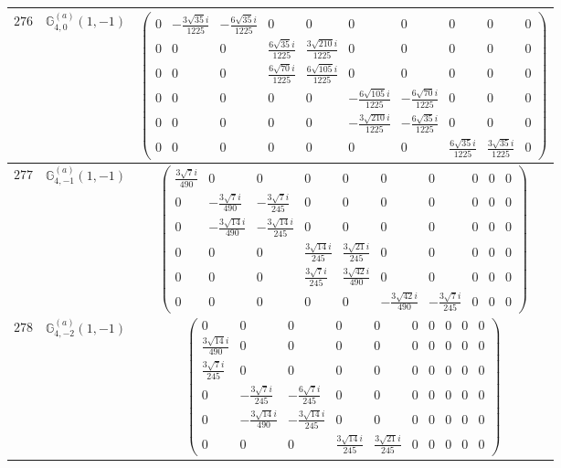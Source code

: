 \documentclass[fleqn,8pt,landscape]{jsarticle}
\begin{document}
\begin{center}
\begin{longtable}{ccc}
$ 276 $ & $ \mathbb{G}_{4,0}^{(a)}(1,-1) $ & $ \begin{pmatrix} 0 & - \frac{3 \sqrt{35} i}{1225} & - \frac{6 \sqrt{35} i}{1225} & 0 & 0 & 0 & 0 & 0 & 0 & 0 \\ 0 & 0 & 0 & \frac{6 \sqrt{35} i}{1225} & \frac{3 \sqrt{210} i}{1225} & 0 & 0 & 0 & 0 & 0 \\ 0 & 0 & 0 & \frac{6 \sqrt{70} i}{1225} & \frac{6 \sqrt{105} i}{1225} & 0 & 0 & 0 & 0 & 0 \\ 0 & 0 & 0 & 0 & 0 & - \frac{6 \sqrt{105} i}{1225} & - \frac{6 \sqrt{70} i}{1225} & 0 & 0 & 0 \\ 0 & 0 & 0 & 0 & 0 & - \frac{3 \sqrt{210} i}{1225} & - \frac{6 \sqrt{35} i}{1225} & 0 & 0 & 0 \\ 0 & 0 & 0 & 0 & 0 & 0 & 0 & \frac{6 \sqrt{35} i}{1225} & \frac{3 \sqrt{35} i}{1225} & 0 \end{pmatrix} $ \\ \hline
$ 277 $ & $ \mathbb{G}_{4,-1}^{(a)}(1,-1) $ & $ \begin{pmatrix} \frac{3 \sqrt{7} i}{490} & 0 & 0 & 0 & 0 & 0 & 0 & 0 & 0 & 0 \\ 0 & - \frac{3 \sqrt{7} i}{490} & - \frac{3 \sqrt{7} i}{245} & 0 & 0 & 0 & 0 & 0 & 0 & 0 \\ 0 & - \frac{3 \sqrt{14} i}{490} & - \frac{3 \sqrt{14} i}{245} & 0 & 0 & 0 & 0 & 0 & 0 & 0 \\ 0 & 0 & 0 & \frac{3 \sqrt{14} i}{245} & \frac{3 \sqrt{21} i}{245} & 0 & 0 & 0 & 0 & 0 \\ 0 & 0 & 0 & \frac{3 \sqrt{7} i}{245} & \frac{3 \sqrt{42} i}{490} & 0 & 0 & 0 & 0 & 0 \\ 0 & 0 & 0 & 0 & 0 & - \frac{3 \sqrt{42} i}{490} & - \frac{3 \sqrt{7} i}{245} & 0 & 0 & 0 \end{pmatrix} $ \\ \hline
$ 278 $ & $ \mathbb{G}_{4,-2}^{(a)}(1,-1) $ & $ \begin{pmatrix} 0 & 0 & 0 & 0 & 0 & 0 & 0 & 0 & 0 & 0 \\ \frac{3 \sqrt{14} i}{490} & 0 & 0 & 0 & 0 & 0 & 0 & 0 & 0 & 0 \\ \frac{3 \sqrt{7} i}{245} & 0 & 0 & 0 & 0 & 0 & 0 & 0 & 0 & 0 \\ 0 & - \frac{3 \sqrt{7} i}{245} & - \frac{6 \sqrt{7} i}{245} & 0 & 0 & 0 & 0 & 0 & 0 & 0 \\ 0 & - \frac{3 \sqrt{14} i}{490} & - \frac{3 \sqrt{14} i}{245} & 0 & 0 & 0 & 0 & 0 & 0 & 0 \\ 0 & 0 & 0 & \frac{3 \sqrt{14} i}{245} & \frac{3 \sqrt{21} i}{245} & 0 & 0 & 0 & 0 & 0 \end{pmatrix} $ \\ \hline

\end{longtable}
\end{center}
\end{document}
